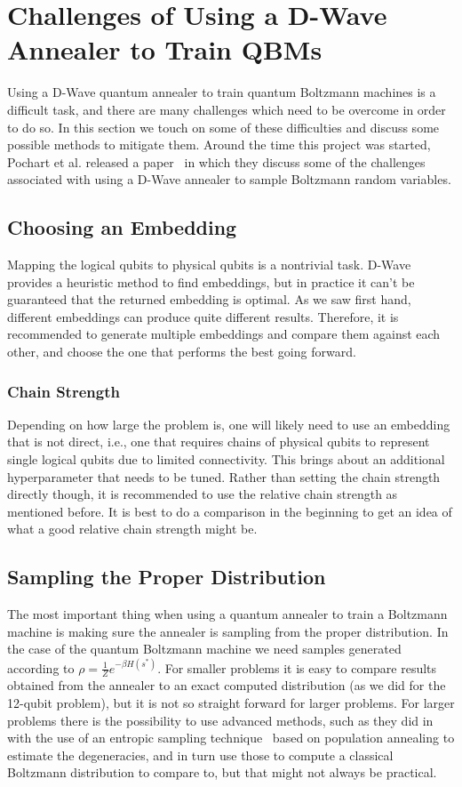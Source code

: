 \section{Challenges of Using a D-Wave Annealer to Train QBMs}
Using a D-Wave quantum annealer to train quantum Boltzmann machines is a difficult task, and there are many challenges which need to be overcome in order to do so.
In this section we touch on some of these difficulties and discuss some possible methods to mitigate them.
Around the time this project was started, Pochart et al. released a paper~\cite{pochart_2021} in which they discuss some of the challenges associated with using a D-Wave annealer to sample Boltzmann random variables.

\subsection{Choosing an Embedding}
Mapping the logical qubits to physical qubits is a nontrivial task.
D-Wave provides a heuristic method to find embeddings, but in practice it can't be guaranteed that the returned embedding is optimal.
As we saw first hand, different embeddings can produce quite different results.
Therefore, it is recommended to generate multiple embeddings and compare them against each other, and choose the one that performs the best going forward.

\subsubsection{Chain Strength}
Depending on how large the problem is, one will likely need to use an embedding that is not direct, i.e., one that requires chains of physical qubits to represent single logical qubits due to limited connectivity.
This brings about an additional hyperparameter that needs to be tuned.
Rather than setting the chain strength directly though, it is recommended to use the relative chain strength as mentioned before.
It is best to do a comparison in the beginning to get an idea of what a good relative chain strength might be.

\subsection{Sampling the Proper Distribution}
The most important thing when using a quantum annealer to train a Boltzmann machine is making sure the annealer is sampling from the proper distribution.
In the case of the quantum Boltzmann machine we need samples generated according to \( \rho = \frac{1}{Z} e^{-\beta H(s^*)} \).
For smaller problems it is easy to compare results obtained from the annealer to an exact computed distribution (as we did for the 12-qubit problem), but it is not so straight forward for larger problems.
For larger problems there is the possibility to use advanced methods, such as they did in~\cite{marshall_2019} with the use of an entropic sampling technique~\cite{barash_2019} based on population annealing to estimate the degeneracies, and in turn use those to compute a classical Boltzmann distribution to compare to, but that might not always be practical.

